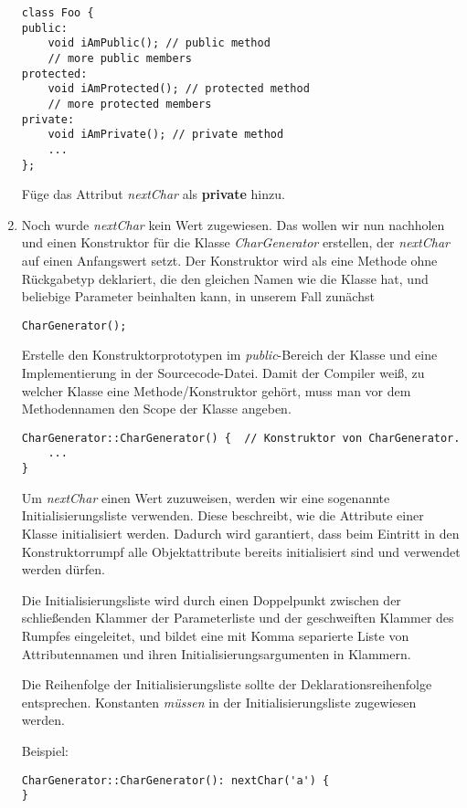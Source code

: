 \begin{enumerate}
\begin{lstlisting}
class Foo { 
public:
	void iAmPublic(); // public method
	// more public members
protected:
	void iAmProtected(); // protected method
	// more protected members
private:
	void iAmPrivate(); // private method
	...
};
\end{lstlisting}

Füge das Attribut \emph{nextChar} als \textbf{private} hinzu.

\item
Noch wurde \emph{nextChar} kein Wert zugewiesen.
Das wollen wir nun nachholen und einen Konstruktor für die Klasse \emph{CharGenerator} erstellen, der \emph{nextChar} auf einen Anfangswert setzt.
Der Konstruktor wird als eine Methode ohne Rückgabetyp deklariert, die den gleichen Namen wie die Klasse hat, und beliebige Parameter beinhalten kann, in unserem Fall zunächst 
\begin{lstlisting}
CharGenerator();
\end{lstlisting}

Erstelle den Konstruktorprototypen im \emph{public}-Bereich der Klasse und eine Implementierung in der Sourcecode-Datei. Damit der Compiler weiß, zu welcher Klasse eine Methode/Konstruktor gehört, muss man vor dem Methodennamen den Scope der Klasse angeben.

\begin{lstlisting}
CharGenerator::CharGenerator() {  // Konstruktor von CharGenerator.
	...
}
\end{lstlisting}

Um \emph{nextChar} einen Wert zuzuweisen, werden wir eine sogenannte Initialisierungsliste verwenden.
Diese beschreibt, wie die Attribute einer Klasse initialisiert werden.
Dadurch wird garantiert, dass beim Eintritt in den Konstruktorrumpf alle Objektattribute bereits initialisiert sind und verwendet werden dürfen.

Die Initialisierungsliste wird durch einen Doppelpunkt zwischen der schließenden Klammer der Parameterliste und der geschweiften Klammer des Rumpfes eingeleitet, und bildet eine mit Komma separierte Liste von Attributennamen und ihren Initialisierungsargumenten in Klammern.

Die Reihenfolge der Initialisierungsliste sollte der Deklarationsreihenfolge entsprechen.
Konstanten \emph{müssen} in der Initialisierungsliste zugewiesen werden.

Beispiel:

\begin{lstlisting}
CharGenerator::CharGenerator(): nextChar('a') {
}
\end{lstlisting}


\end{enumerate}
